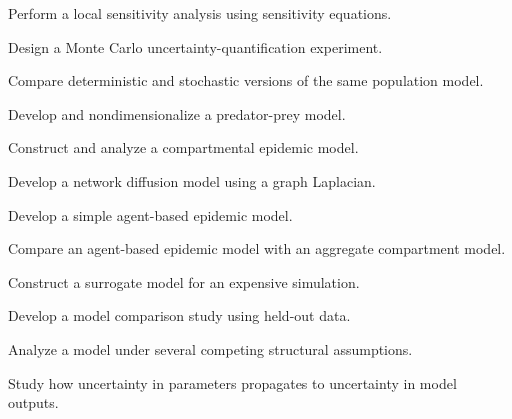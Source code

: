 \begin{exercise}[4]
Perform a local sensitivity analysis using sensitivity equations.
\end{exercise}

\begin{exercise}[4]
Design a Monte Carlo uncertainty-quantification experiment.
\end{exercise}

\begin{exercise}[4]
Compare deterministic and stochastic versions of the same population model.
\end{exercise}

\begin{exercise}[4]
Develop and nondimensionalize a predator-prey model.
\end{exercise}

\begin{exercise}[4]
Construct and analyze a compartmental epidemic model.
\end{exercise}

\begin{exercise}[4]
Develop a network diffusion model using a graph Laplacian.
\end{exercise}

\begin{exercise}[4]
Develop a simple agent-based epidemic model.
\end{exercise}

\begin{exercise}[4]
Compare an agent-based epidemic model with an aggregate compartment model.
\end{exercise}

\begin{exercise}[4]
Construct a surrogate model for an expensive simulation.
\end{exercise}

\begin{exercise}[4]
Develop a model comparison study using held-out data.
\end{exercise}

\begin{exercise}[4]
Analyze a model under several competing structural assumptions.
\end{exercise}

\begin{exercise}[4]
Study how uncertainty in parameters propagates to uncertainty in model
outputs.
\end{exercise}

